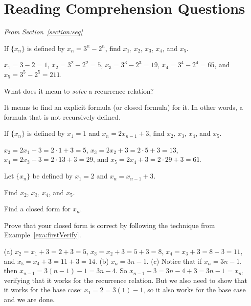 \section{Reading Comprehension Questions}

\noindent
{\em From Section~\ref{section:seq}}


\begin{requ}
If $\{x_n\}$ is defined by $x_n=3^n-2^n$, find $x_1$, $x_2$, $x_3$, $x_4$, and $x_5$.
\begin{requanswer}
$x_1=3-2=1$, $x_2=3^2-2^2=5$, $x_3=3^3-2^3=19$, $x_4=3^4-2^4=65$, and $x_5=3^5-2^5=211$.
\end{requanswer}
\end{requ}


\begin{requ}
What does it mean to {\em solve} a recurrence relation?
\begin{requanswer}
It means to find an explicit formula (or closed formula) for it.
In other words, a formula that is not recursively defined.
\end{requanswer}
\end{requ}

\begin{requ}
If $\{x_n\}$ is defined by $x_1=1$ and $x_n=2x_{n-1} + 3$, find $x_2$, $x_3$, $x_4$, and $x_5$.
\begin{requanswer}
$x_2=2 x_1+3 = 2\cdot 1+3=5$, $x_3=2 x_2+3 = 2\cdot 5+3=13$, $x_4=2 x_3+3=2\cdot 13+3=29$, 
and $x_5=2 x_4+3=2\cdot 29+3=61$.
\end{requanswer}
\end{requ}

\begin{requ}
Let $\{x_n\}$ be defined by $x_1=2$ and $x_n=x_{n-1}+3$.
\begin{lenum}
\item Find $x_2$, $x_3$, $x_4$, and $x_5$. 
\item Find a closed form for $x_n$.
\item Prove that your closed form is correct by following the technique from Example~\ref{exa:firstVerify}.
\end{lenum}
\begin{requanswer}
(a) $x_2=x_1+3 = 2+3=5$, $x_3=x_2+3 = 5+3=8$, $x_4=x_3+3=8+3=11$, and $x_5=x_4+3=11+3=14$.
(b) $x_n=3n-1$.
(c) Notice that if $x_n=3n-1$, then $x_{n-1}=3(n-1)-1=3n-4$. So
$x_{n-1}+3 = 3n-4+3=3n-1=x_n$, verifying that it works for the recurrence relation.
But we also need to show that it works for the base case: $x_1=2=3(1)-1$, so it also works for the base case and we
are done. 
\end{requanswer}
\end{requ}

